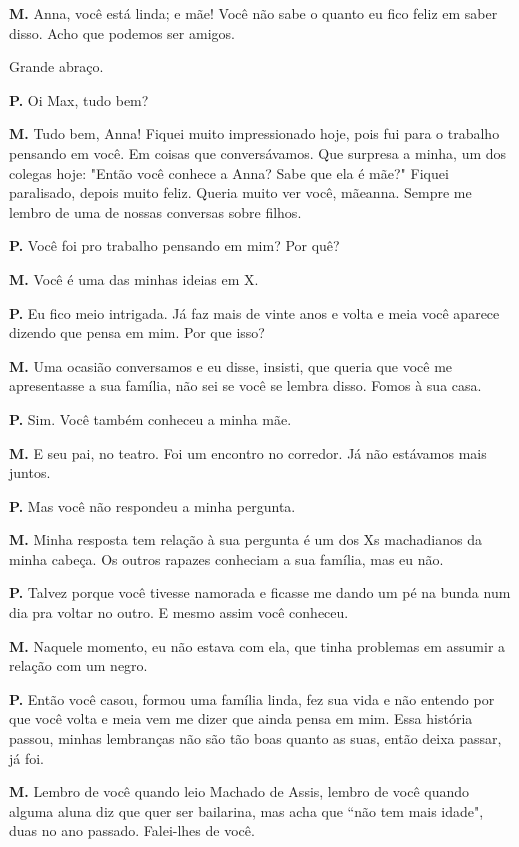 {\parindent0pt\parskip1pt\raggedright
\textbf{M.} Anna, você está linda; e mãe! Você não sabe o quanto eu fico
feliz em saber disso. Acho que podemos ser amigos.

Grande abraço.

\textbf{P.} Oi Max, tudo bem?

\textbf{M.} Tudo bem, Anna! Fiquei muito impressionado hoje, pois fui
para o trabalho pensando em você. Em coisas que conversávamos. Que
surpresa a minha, um dos colegas hoje: "Então você conhece a Anna? Sabe
que ela é mãe?" Fiquei paralisado, depois muito feliz. Queria muito ver
você, mãeanna. Sempre me lembro de uma de nossas conversas sobre filhos.

\textbf{P.} Você foi pro trabalho pensando em mim? Por quê?

\textbf{M.} Você é uma das minhas ideias em X.

\textbf{P.} Eu fico meio intrigada. Já faz mais de vinte anos e volta e
meia você aparece dizendo que pensa em mim. Por que isso?

\textbf{M.} Uma ocasião conversamos e eu disse, insisti, que queria que
você me apresentasse a sua família, não sei se você se lembra disso.
Fomos à sua casa.

\textbf{P.} Sim. Você também conheceu a minha mãe.

\textbf{M.} E seu pai, no teatro. Foi um encontro no corredor. Já não
estávamos mais juntos.

\textbf{P.} Mas você não respondeu a minha pergunta.

\textbf{M.} Minha resposta tem relação à sua pergunta é um dos Xs
machadianos da minha cabeça. Os outros rapazes conheciam a sua família,
mas eu não.

\textbf{P.} Talvez porque você tivesse namorada e ficasse me dando um pé
na bunda num dia pra voltar no outro. E mesmo assim você conheceu.

\textbf{M.} Naquele momento, eu não estava com ela, que tinha problemas
em assumir a relação com um negro.

\textbf{P.} Então você casou, formou uma família linda, fez sua vida e
não entendo por que você volta e meia vem me dizer que ainda pensa em
mim. Essa história passou, minhas lembranças não são tão boas quanto as
suas, então deixa passar, já foi.

\textbf{M.} Lembro de você quando leio Machado de Assis, lembro de você
quando alguma aluna diz que quer ser bailarina, mas acha que ``não tem
mais idade", duas no ano passado. Falei-lhes de você.

}
